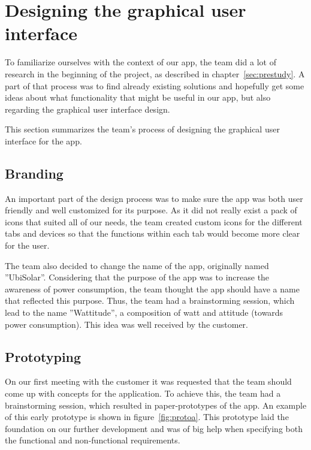 \section{Designing the graphical user interface}
To familiarize ourselves with the context of our app, the team did a lot of research in the beginning of the project, as described in chapter~\ref{sec:prestudy}. A part of that process was to find already existing solutions and hopefully get some ideas about what functionality that might be useful in our app, but also regarding the graphical user interface design.

This section summarizes the team's process of designing the graphical user interface for the app.

\subsection{Branding}
An important part of the design process was to make sure the app was both user friendly and well customized for its purpose. As it did not really exist a pack of icons that suited all of our needs, the team created custom icons for the different tabs and devices so that the functions within each tab would become more clear for the user.

The team also decided to change the name of the app, originally named ''UbiSolar''. Considering that the purpose of the app was to increase the awareness of power consumption, the team thought the app should have a name that reflected this purpose. Thus, the team had a brainstorming session, which lead to the name ''Wattitude'', a composition of watt and attitude (towards power consumption). This idea was well received by the customer.

\subsection{Prototyping}
On our first meeting with the customer it was requested that the team should come up with concepts for the application. To achieve this, the team had a brainstorming session, which resulted in paper-prototypes of the app. An example of this early prototype is shown in figure~\ref{fig:protoa}. This prototype laid the foundation on our further development and was of big help when specifying both the functional and non-functional requirements.

